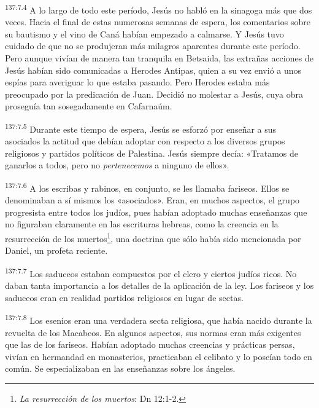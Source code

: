 \par 
\textsuperscript{137:7.4} A lo largo de todo este período, Jesús no habló en la sinagoga más que dos veces. Hacia el final de estas numerosas semanas de espera, los comentarios sobre su bautismo y el vino de Caná habían empezado a calmarse. Y Jesús tuvo cuidado de que no se produjeran más milagros aparentes durante este período. Pero aunque vivían de manera tan tranquila en Betsaida, las extrañas acciones de Jesús habían sido comunicadas a Herodes Antipas, quien a su vez envió a unos espías para averiguar lo que estaba pasando. Pero Herodes estaba más preocupado por la predicación de Juan. Decidió no molestar a Jesús, cuya obra proseguía tan sosegadamente en Cafarnaúm.

\par 
\textsuperscript{137:7.5} Durante este tiempo de espera, Jesús se esforzó por enseñar a sus asociados la actitud que debían adoptar con respecto a los diversos grupos religiosos y partidos políticos de Palestina. Jesús siempre decía: «Tratamos de ganarlos a todos, pero no \textit{pertenecemos} a ninguno de ellos».

\par 
\textsuperscript{137:7.6} A los escribas y rabinos, en conjunto, se les llamaba fariseos. Ellos se denominaban a sí mismos los «asociados». Eran, en muchos aspectos, el grupo progresista entre todos los judíos, pues habían adoptado muchas enseñanzas que no figuraban claramente en las escrituras hebreas, como la creencia en la resurrección de los muertos\footnote{\textit{La resurrección de los muertos}: Dn 12:1-2.}, una doctrina que sólo había sido mencionada por Daniel, un profeta reciente.

\par 
\textsuperscript{137:7.7} Los saduceos estaban compuestos por el clero y ciertos judíos ricos. No daban tanta importancia a los detalles de la aplicación de la ley. Los fariseos y los saduceos eran en realidad partidos religiosos en lugar de sectas.

\par 
\textsuperscript{137:7.8} Los esenios eran una verdadera secta religiosa, que había nacido durante la revuelta de los Macabeos. En algunos aspectos, sus normas eran más exigentes que las de los fariseos. Habían adoptado muchas creencias y prácticas persas, vivían en hermandad en monasterios, practicaban el celibato y lo poseían todo en común. Se especializaban en las enseñanzas sobre los ángeles.

